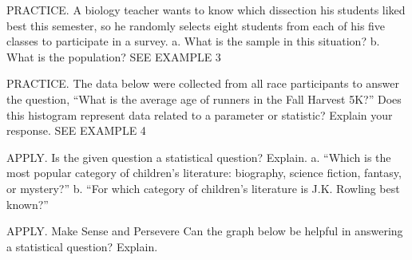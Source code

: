 \documentclass{article}
\newenvironment{practice}[2]{}{}        %
\newcommand{\answer}[1]{}               %
\newcommand{\placeholder}[2]{}          %
\begin{document}
\begin{practice}{14}{1}
PRACTICE. A biology teacher wants to know which dissection his students liked best this semester, so he randomly selects eight students from each of his five classes to participate in a survey.
a. What is the sample in this situation?
b. What is the population? SEE EXAMPLE 3
\answer{a. The sample is the 40 students the biology teacher randomly selected to participate in his survey. b. The population is all of the students in all 5 of this biology teacher's classes.}
\end{practice}
\begin{practice}{15}{2}
PRACTICE. The data below were collected from all race participants to answer the question, ``What is the average age of runners in the Fall Harvest 5K?'' Does this histogram represent data related to a parameter or statistic? Explain your response. SEE EXAMPLE 4
\placeholder{graph}{Fall Harvest 5K green histogram over a crowd photograph. Horizontal Ages, categories 10--19,20--29,30--39,40--49,50--59,60--69,70--79, labels rotated vertically. Vertical Number of Participants, 0 through 60 every 10. Adjacent bar heights approximately 32,49,57,53,38,22,4. No arrows.}
\answer{The data summary shown in the histogram represents a parameter because it shows all the numbers of participants within different age brackets in a 5K.}
\end{practice}
\begin{practice}{16}{1}
APPLY. Is the given question a statistical question? Explain.
a. ``Which is the most popular category of children's literature: biography, science fiction, fantasy, or mystery?''
b. ``For which category of children's literature is J.K. Rowling best known?''
\answer{a. Yes; it is a statistical question that can be answered by collecting the responses of many people. b. No; it is a question for which there is only one answer.}
\end{practice}
\begin{practice}{17}{1}
APPLY. Make Sense and Persevere Can the graph below be helpful in answering a statistical question? Explain.
\placeholder{graph}{Recommended Vitamin C. Horizontal Age (years) 0 to 70 every 10; vertical Vitamin C (mg), 0 to 80 every 20, grid extends to 100. Positive-axis arrows. Red filled points: approximately (2,15); ages 4--8 at 25 mg; ages 9--13 at 45 mg; ages 14--18 at 70 mg; separate points at ages 19,25,33--36,45,50--51,59--61,66--70 at 80 mg. Closely spaced points overlap into short horizontal groups.}
\answer{No; this is a response to the question ``What is the recommended amount of Vitamin C people of varying ages should consume per day?'' This is a question that is answered with one predetermined piece of information.}
\end{practice}
\end{document}
